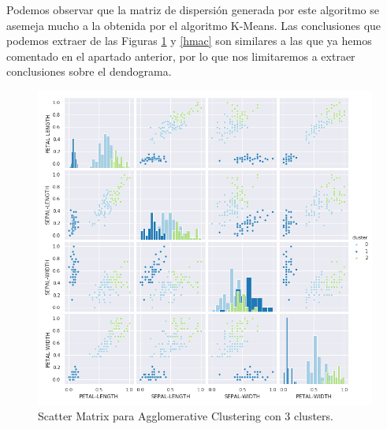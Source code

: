 \documentclass[a4paper, 20pt]{article}
\begin{document}
Podemos observar que la matriz de dispersión generada por este algoritmo se asemeja mucho a la obtenida por el algoritmo K-Means. Las conclusiones que podemos extraer de las Figuras \ref{smac} y \ref{hmac} son similares a las que ya hemos comentado en el apartado anterior, por lo que nos limitaremos a extraer conclusiones sobre el dendograma.

\clearpage

\begin{figure}[h]
\centering
\includegraphics[scale=0.64]{dani/scatmatrixAggClusterIRIS.png}
\caption{Scatter Matrix para Agglomerative Clustering con 3 clusters.}
\label{smac}
\end{figure}

\clearpage
\end{document}
